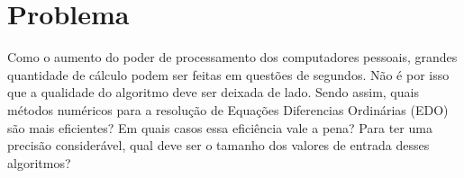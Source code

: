 \section{Problema}\label{lproblema}

Como o aumento do poder de processamento dos computadores pessoais, 
grandes quantidade de cálculo podem ser feitas em questões de segundos. 
Não é por isso que a qualidade do algoritmo deve ser deixada de lado. 
Sendo assim, quais métodos numéricos para a resolução de Equações Diferencias Ordinárias (EDO) são mais 
eficientes? Em quais casos essa eficiência vale a pena? Para ter uma 
precisão considerável, qual deve ser o tamanho dos valores de entrada 
desses algoritmos?
